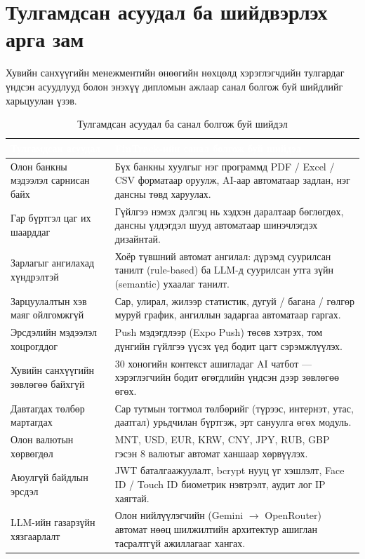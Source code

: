 \section{Тулгамдсан асуудал ба шийдвэрлэх арга зам}
Хувийн санхүүгийн менежментийн өнөөгийн нөхцөлд хэрэглэгчдийн тулгардаг үндсэн асуудлууд болон энэхүү дипломын ажлаар санал болгож буй шийдлийг харьцуулан үзэв.

\begin{table}[ht]
\centering
\footnotesize
\renewcommand{\arraystretch}{1.35}
\begin{tabular}{|p{4.4cm}|p{8cm}|}
\hline
\rowcolor{darknavy}
\textcolor{white}{\textbf{Тулгамдсан асуудал}} & \textcolor{white}{\textbf{FinTrack-ийн санал болгож буй шийдэл}} \\ \hline
Олон банкны мэдээлэл сарнисан байх & Бүх банкны хуулгыг нэг программд PDF / Excel / CSV форматаар оруулж, AI-аар автоматаар задлан, нэг дансны төвд харуулах. \\ \hline
Гар бүртгэл цаг их шаарддаг & Гүйлгээ нэмэх дэлгэц нь хэдхэн даралтаар бөглөгдөх, дансны үлдэгдэл шууд автоматаар шинэчлэгдэх дизайнтай. \\ \hline
Зарлагыг ангилахад хүндрэлтэй & Хоёр түвшний автомат ангилал: дүрэмд суурилсан танилт (rule-based) ба LLM-д суурилсан утга зүйн (semantic) ухаалаг танилт. \\ \hline
Зарцуулалтын хэв маяг ойлгомжгүй & Сар, улирал, жилээр статистик, дугуй / багана / гөлгөр муруй график, ангиллын задаргаа автоматаар гаргах. \\ \hline
Эрсдэлийн мэдээлэл хоцрогддог & Push мэдэгдлээр (Expo Push) төсөв хэтрэх, том дүнгийн гүйлгээ үүсэх үед бодит цагт сэрэмжлүүлэх. \\ \hline
Хувийн санхүүгийн зөвлөгөө байхгүй & 30 хоногийн контекст ашигладаг AI чатбот --- хэрэглэгчийн бодит өгөгдлийн үндсэн дээр зөвлөгөө өгөх. \\ \hline
Давтагдах төлбөр мартагдах & Сар тутмын тогтмол төлбөрийг (түрээс, интернэт, утас, даатгал) урьдчилан бүртгэж, эрт сануулга өгөх модуль. \\ \hline
Олон валютын хөрвөгдөл & MNT, USD, EUR, KRW, CNY, JPY, RUB, GBP гэсэн 8 валютыг автомат ханшаар хөрвүүлэх. \\ \hline
Аюулгүй байдлын эрсдэл & JWT баталгаажуулалт, bcrypt нууц үг хэшлэлт, Face ID / Touch ID биометрик нэвтрэлт, аудит лог IP хаягтай. \\ \hline
LLM-ийн газарзүйн хязгаарлалт & Олон нийлүүлэгчийн (Gemini $\to$ OpenRouter) автомат нөөц шилжилтийн архитектур ашиглан тасралтгүй ажиллагааг хангах. \\ \hline
\end{tabular}
\caption{Тулгамдсан асуудал ба санал болгож буй шийдэл}
\label{tab:problem-solution}
\end{table}

